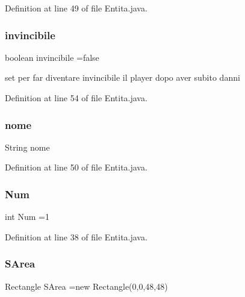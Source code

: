 Definition at line 49 of file Entita.\+java.

\mbox{\label{class_entita_1_1_entita_afb759606adf5eb47c3e8b17e32968115}} 
\subsubsection{\texorpdfstring{invincibile}{invincibile}}
{\footnotesize\ttfamily boolean invincibile =false}

set per far diventare invincibile il player dopo aver subito danni 

Definition at line 54 of file Entita.\+java.

\mbox{\label{class_entita_1_1_entita_a4cfff30ec02286864b995e013b6c2a41}} 
\subsubsection{\texorpdfstring{nome}{nome}}
{\footnotesize\ttfamily String nome}



Definition at line 50 of file Entita.\+java.

\mbox{\label{class_entita_1_1_entita_a558051bc0b213b418d65f58e4ad9a311}} 
\subsubsection{\texorpdfstring{Num}{Num}}
{\footnotesize\ttfamily int Num =1}



Definition at line 38 of file Entita.\+java.

\mbox{\label{class_entita_1_1_entita_abc4c4a84c9edea554a8b72a7d929e664}} 
\subsubsection{\texorpdfstring{S\+Area}{SArea}}
{\footnotesize\ttfamily Rectangle S\+Area =new Rectangle(0,0,48,48)}

